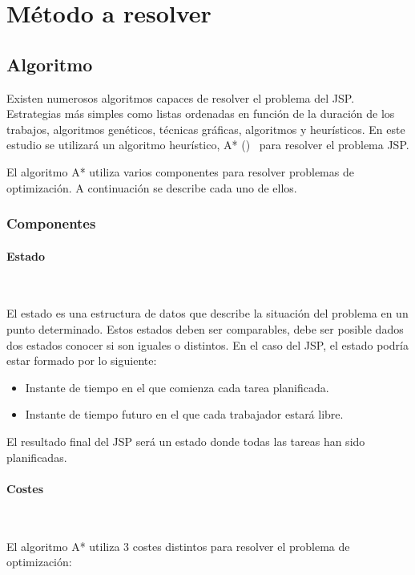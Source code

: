 \section{Método a resolver}

\subsection{Algoritmo}

Existen numerosos algoritmos capaces de resolver el problema del JSP\@.
Estrategias más simples como listas ordenadas en función de la duración
de los trabajos, algoritmos genéticos, técnicas gráficas,
algoritmos  y heurísticos.
En este estudio se utilizará un algoritmo heurístico, A* ()~\cite{HNR68}
para resolver el problema JSP\@.

El algoritmo A* utiliza varios componentes para resolver problemas
de optimización. A continuación se describe cada uno de ellos.

\subsubsection{Componentes}

\paragraph{Estado}~

El estado es una estructura de datos que describe la situación
del problema en un punto determinado.
Estos estados deben ser comparables,
debe ser posible dados dos estados conocer si son iguales o distintos.
En el caso del JSP, el estado podría estar formado por lo siguiente:

\begin{itemize}[itemsep=0.25px]
    \item Instante de tiempo en el que comienza cada tarea planificada.
    \item Instante de tiempo futuro en el que cada trabajador estará libre.
\end{itemize}

El resultado final del JSP será un estado donde todas las tareas han sido planificadas.

\paragraph{Costes}~

El algoritmo A* utiliza 3 costes distintos para resolver el problema de optimización:

